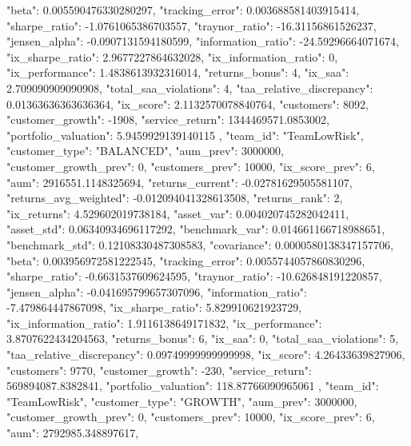 {{            "beta": 0.005590476330280297,
            "tracking_error": 0.003688581403915414,
            "sharpe_ratio": -1.0761065386703557,
            "traynor_ratio": -16.31156861526237,
            "jensen_alpha": -0.0907131594180599,
            "information_ratio": -24.59296664071674,
            "ix_sharpe_ratio": 2.9677227864632028,
            "ix_information_ratio": 0,
            "ix_performance": 1.4838613932316014,
            "returns_bonus": 4,
            "ix_saa": 2.709090909090908,
            "total_saa_violations": 4,
            "taa_relative_discrepancy": 0.01363636363636364,
            "ix_score": 2.1132570078840764,
            "customers": 8092,
            "customer_growth": -1908,
            "service_return": 1344469571.0853002,
            "portfolio_valuation": 5.9459929139140115
        },
        {
            "team_id": "TeamLowRisk",
            "customer_type": "BALANCED",
            "aum_prev": 3000000,
            "customer_growth_prev": 0,
            "customers_prev": 10000,
            "ix_score_prev": 6,
            "aum": 2916551.1148325694,
            "returns_current": -0.02781629505581107,
            "returns_avg_weighted": -0.012094041328613508,
            "returns_rank": 2,
            "ix_returns": 4.529602019738184,
            "asset_var": 0.004020745282042411,
            "asset_std": 0.06340934696117292,
            "benchmark_var": 0.014661166718988651,
            "benchmark_std": 0.12108330487308583,
            "covariance": 0.0000580138347157706,
            "beta": 0.003956972581222545,
            "tracking_error": 0.0055744057860830296,
            "sharpe_ratio": -0.6631537609624595,
            "traynor_ratio": -10.626848191220857,
            "jensen_alpha": -0.041695799657307096,
            "information_ratio": -7.479864447867098,
            "ix_sharpe_ratio": 5.829910621923729,
            "ix_information_ratio": 1.9116138649171832,
            "ix_performance": 3.8707622434204563,
            "returns_bonus": 6,
            "ix_saa": 0,
            "total_saa_violations": 5,
            "taa_relative_discrepancy": 0.09749999999999998,
            "ix_score": 4.26433639827906,
            "customers": 9770,
            "customer_growth": -230,
            "service_return": 569894087.8382841,
            "portfolio_valuation": 118.87766090965061
        },
        {
            "team_id": "TeamLowRisk",
            "customer_type": "GROWTH",
            "aum_prev": 3000000,
            "customer_growth_prev": 0,
            "customers_prev": 10000,
            "ix_score_prev": 6,
            "aum": 2792985.348897617,
}}

